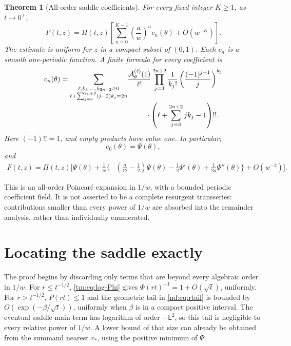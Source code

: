 \documentclass[11pt,a4paper,oneside,openany]{book}
\numberwithin{equation}{chapter}
\newtheorem{theorem}{Theorem}[chapter]
\theoremstyle{definition}
\theoremstyle{remark}
\newcommand{\Lsad}{\mathsf L}
\begin{document}
\begin{theorem}[All-order saddle coefficients]
\label{nd:thm:saddle}
For every fixed integer \(K\ge1\), as \(t\to0^+\),
\begin{equation}
 F(t,z)=\Pi(t,z)\left[
       \sum_{n=0}^{K-1}\left(\frac aw\right)^n c_n(\theta)
       +O(w^{-K})\right].
 \label{nd:eq:fullsaddle}
\end{equation}
The estimate is uniform for \(z\) in a compact subset of \((0,1)\). Each
\(c_n\) is a smooth one-periodic function. A finite formula for every
coefficient is
\begin{equation}
\begin{split}
 c_n(\theta)=
 \sum_{\substack{\ell,k_3,\ldots,k_{2n+2}\ge0\\
       \ell+\sum_{j=3}^{2n+2}(j-2)k_j=2n}}
 &\frac{\mathcal A_\theta^{(\ell)}(1)}{\ell!}
 \prod_{j=3}^{2n+2}
       \frac{1}{k_j!}\left(\frac{(-1)^{j+1}}j\right)^{k_j}\\[-1mm]
 &\hspace{9mm}\cdot
       \left(\ell+\sum_{j=3}^{2n+2}jk_j-1\right)!! .
\end{split}
\label{nd:eq:cn}
\end{equation}
Here \((-1)!!=1\), and empty products have value one. In particular,
\begin{equation}
 c_0(\theta)=\Psi(\theta),
 \label{nd:eq:c0}
\end{equation}
and
\begin{equation}
\begin{split}
 F(t,z)=\Pi(t,z)\Bigg[\Psi(\theta)+\frac1w\bigg\{&
  \left(\frac a{12}-\frac12\right)\Psi(\theta)
  -\frac12\Psi'(\theta)
  +\frac1{2a}\Psi''(\theta)\bigg\}
  +O(w^{-2})\Bigg].
\end{split}
\label{nd:eq:firstsaddle}
\end{equation}
\end{theorem}

This is an all-order Poincar\'e expansion in \(1/w\), with a bounded periodic
coefficient field. It is not asserted to be a complete resurgent transseries:
contributions smaller than every power of \(1/w\) are absorbed into the
remainder analysis, rather than individually enumerated.

\section{Locating the saddle exactly}
The proof begins by discarding only terms that are beyond every algebraic
order in \(1/w\). For \(r\le t^{-1/2}\), \eqref{tm:eq:log-Phi} gives
\(\Phi(rt)^{-1}=1+O(\sqrt t)\), uniformly. For \(r>t^{-1/2}\),
\(P(rt)\le1\) and the geometric tail in \eqref{nd:eq:rtail} is bounded by
\(O(\exp(-\beta/\sqrt t))\), uniformly when \(\beta\) is in a compact
positive interval. The eventual saddle main term has logarithm of order
\(-\Lsad^2\), so this tail is negligible to every relative power of \(1/w\).
A lower bound of that size can already be obtained from the summand nearest
\(r_*\), using the positive minimum of \(\Psi\).
\end{document}
